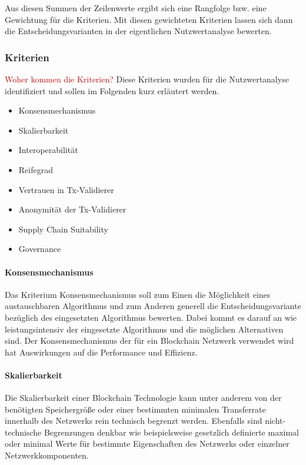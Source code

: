 Aus diesen Summen der Zeilenwerte ergibt sich eine Rangfolge bzw. eine Gewichtung für die Kriterien. Mit diesen gewichteten Kriterien lassen sich dann die Entscheidungsvarianten in der eigentlichen Nutzwertanalyse bewerten.

\subsubsection{Kriterien}
\textcolor{red}{Woher kommen die Kriterien?} Diese Kriterien wurden für die Nutzwertanalyse identifiziert und sollen im Folgenden kurz erläutert werden.

\begin{itemize}
	\item Konsensmechanismus
	\item Skalierbarkeit
	\item Interoperabilität
	\item Reifegrad
	\item Vertrauen in Tx-Validierer
	\item Anonymität der Tx-Validierer
	\item Supply Chain Suitability
	\item Governance
\end{itemize}

\paragraph{Konsensmechanismus}
Das Kriterium Konsensmechanismus soll zum Einen die Möglichkeit eines austauschbaren Algorithmus und zum Anderen generell die Entscheidungsvariante bezüglich des eingesetzten Algorithmus bewerten. Dabei kommt es darauf an wie leistungsintensiv der eingesetzte Algorithmus und die möglichen Alternativen sind. Der Konsensmechanismus der für ein Blockchain Netzwerk verwendet wird hat Auswirkungen auf die Performance und Effizienz.

\paragraph{Skalierbarkeit}
Die Skalierbarkeit einer Blockchain Technologie kann unter anderem von der benötigten Speichergröße oder einer bestimmten minimalen Transferrate innerhalb des Netzwerks rein technisch begrenzt werden. Ebenfalls sind nicht-technische Begrenzungen denkbar wie beispielsweise gesetzlich definierte maximal oder minimal Werte für bestimmte Eigenschaften des Netzwerks oder einzelner Netzwerkkomponenten.

